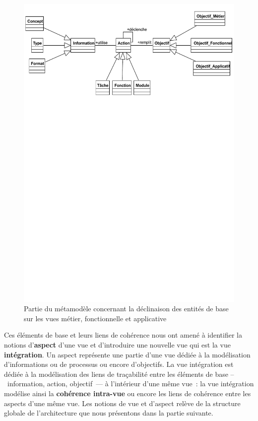     \begin{figure}[!ht]
        \begin{center}
    \includegraphics[trim= 0cm 20cm 0cm 0cm, width=1\textwidth]{figures/4_demarche/core_concept_vues.pdf}
        \end{center}
        \caption{Partie du métamodèle concernant la déclinaison des entités de base sur les vues métier, fonctionnelle et applicative} 
        \label{fig:core_concepts}
    \end{figure}

    Ces éléments de base et leurs liens de cohérence nous ont amené à identifier la notions d'\textbf{aspect} d'une vue
    et d'introduire une nouvelle vue qui est la vue \textbf{intégration}.
    Un aspect représente une partie d'une vue dédiée à la modélisation d'informations ou de processus
    ou encore d'objectifs. 
    La vue intégration est dédiée à la modélisation des liens de traçabilité entre les éléments de base –~information,
    action, objectif~— à l'intérieur d'une même vue~: la vue intégration modélise ainsi la \textbf{cohérence intra-vue}
    ou encore les liens de cohérence entre les aspects d'une même vue.
    Les notions de vue et d'aspect relève de la structure globale de l'architecture que nous présentons dans la partie suivante.

